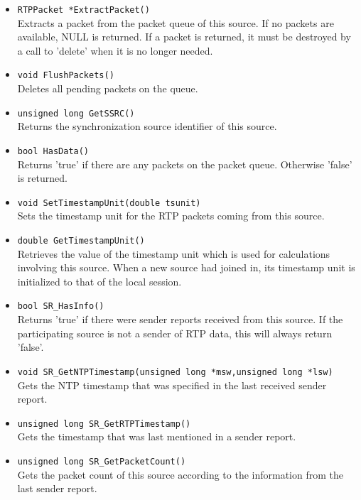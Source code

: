 \begin{itemize}

\item {\tt RTPPacket *ExtractPacket()}\\
	Extracts a packet from the packet queue of this source. If no packets
	are available, NULL is returned. If a packet is returned, it must be
	destroyed by a call to 'delete' when it is no longer needed.

\item {\tt void FlushPackets()}\\
	Deletes all pending packets on the queue.

\item {\tt unsigned long GetSSRC()}\\
	Returns the synchronization source identifier of this source.

\item {\tt bool HasData()}\\
	Returns 'true' if there are any packets on the packet queue. Otherwise
	'false' is returned.

\item {\tt void SetTimestampUnit(double tsunit)}\\
 	Sets the timestamp unit for the RTP packets coming from this source.

\item {\tt double GetTimestampUnit()}\\
	Retrieves the value of the timestamp unit which is used for calculations
	involving this source. When a new source had joined in, its timestamp
	unit is initialized to that of the local session.
	
\item {\tt bool SR\_HasInfo()}\\
	Returns 'true' if there were sender reports received from this
	source. If the participating source is not a sender of RTP data,
	this will always return 'false'.

\item {\tt void SR\_GetNTPTimestamp(unsigned long *msw,unsigned long *lsw)}\\
	Gets the NTP timestamp that was specified in the last received
	sender report.

\item {\tt unsigned long SR\_GetRTPTimestamp()}\\
	Gets the timestamp that was last mentioned in a sender report.

\item {\tt unsigned long SR\_GetPacketCount()}\\
	Gets the packet count of this source according to the information
	from the last sender report.


\end{itemize}
